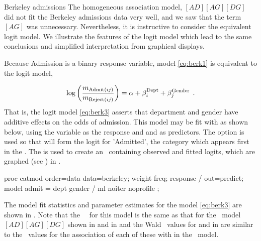 \begin{Example}[berkeley7]{Berkeley admissions}
The homogeneous association model, $[AD] [AG] [DG]$
did not fit the Berkeley admissions data very well,
and we saw that the term $[AG]$ was unnecessary.
Nevertheless, it is instructive to consider the equivalent logit model.
We illustrate the features of the logit model which lead to the same
conclusions and simplified interpretation from graphical displays.

Because Admission
is a binary response variable, model \eqref{eq:berk1} is equivalent
to the logit model,

\begin{equation}\label{eq:berk3}
  \log \left(
  \frac{m_{ \mbox{\scriptsize{Admit}} (ij) }} {m_{ \mbox{\scriptsize{Reject}} (ij) }}
  \right)
  =
  \alpha   +  \beta _i^{\mbox{\scriptsize Dept}}
  +  \beta _j^{\mbox{\scriptsize Gender}}
  \:\: .
\end{equation}
That is, the logit model \eqref{eq:berk3} asserts that department and
gender have additive effects on the odds of admission.
This model may be fit with 
as shown below, using the variable  as the response
and  and  as predictors.
The option  is used so that  will
form the logit for 'Admitted', the category which appears first
in the \Dset.
The  is used
to create an \ODS\
containing observed and fitted logits, which are graphed
(see ) in
.

\begin{listing}
proc catmod order=data
            data=berkeley;
   weight freq;
   response / out=predict;
   model admit = dept gender / ml noiter noprofile ;
\end{listing}

The model fit statistics and parameter estimates for the model
\eqref{eq:berk3} are shown in .
Note that the \LR\ \GSQ\ for this model is the same as
that for the \loglin\ model $[AD][AG][DG]$
shown in  and in 
and the Wald \chisq\ values for  and 
in 
are similar to the \chisq\ values for the association of each
of these with 
in the \loglin\ model.

\begin{Output}[htb]
\caption{Berkeley admissions data, fit statistics and parameter estimates for the logit model \eqref{eq:berk3}}\label{out:catberk2.1}
\small

\end{Output}


\end{Example}

